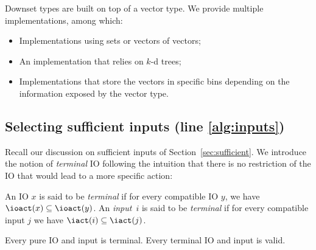 \documentclass[sigconf,screen,nonacm]{acmart}
\begin{document}
Downset types are built on top of a vector type.  We provide multiple
implementations, among which:
\begin{itemize}
\item Implementations using sets or vectors of vectors;
\item An implementation that relies on \(k\)-d trees;
\item Implementations that store the vectors in specific bins depending on the
  information exposed by the vector type.
\end{itemize}

\subsection{Selecting sufficient inputs (line \ref{alg:inputs})}


Recall our discussion on sufficient inputs of Section~\ref{sec:sufficient}.  We
introduce the notion of \emph{terminal} IO following
the intuition that there
is
no restriction of the IO that would lead to a more specific action:
\begin{definition}
  An IO \(x\) is said to be \emph{terminal} if for every compatible IO \(y\), we
  have \(\ioact(x) \subseteq \ioact(y)\).  %
  An \emph{input}~\(i\) is said to be
  \emph{terminal} if for every compatible input \(j\) we have
  \(\iact(i) \subseteq \iact(j)\).
\end{definition}

\begin{proposition}
  Every pure IO and input is terminal.  Every terminal IO and input is valid.
\end{proposition}
\end{document}
